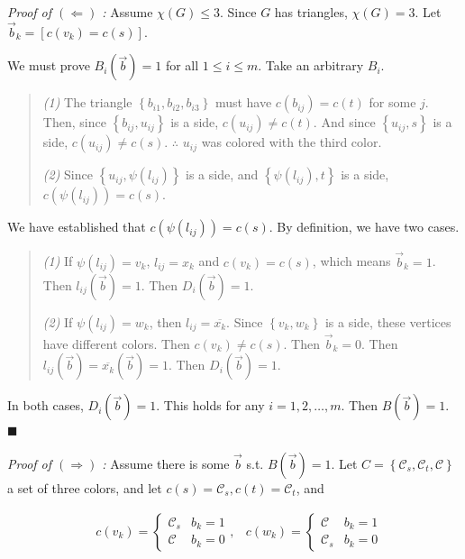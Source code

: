 \documentclass[a4paper, 12pt]{article}
\begin{document}
\textit{Proof of $(\Leftarrow)$ :} Assume $\chi(G) \leq 3$. Since $G$ has
triangles, $\chi(G) = 3$. Let $\overrightarrow{b}_k = \left[ c(v_k) = c(s)
\right] $.

We must prove $B_i(\overrightarrow{b}) = 1$ for all $1 \leq i \leq m$. Take an
arbitrary $B_i$. 


\begin{quote}

\textit{(1)} The triangle $\left\{ b_{i1}, b_{i 2}, b_{i 3} \right\} $
must have $c(b_{ij}) = c(t)$ for some $j$. Then, since $\left\{ b_{ij}, u_{ij}
\right\} $ is a side, $c(u_{ij}) \neq c(t)$. And since $\left\{ u_{ij}, s
\right\} $ is a side, $c(u_{ij}) \neq c(s)$. $\therefore $ $u_{ij}$ was
colored with the third color.

\textit{(2)} Since $\left\{ u_{ij}, \psi(l_{ij}) \right\} $ is a side, and
$\left\{ \psi(l_{ij}), t \right\} $ is a side, $c(\psi(l_{ij})) = c(s)$.

\end{quote}

We have established that $c(\psi(l_{ij})) = c(s)$. By definition, we have two
cases. 

\begin{quote}
    \textit{(1)} If $\psi(l_{ij}) = v_k$, $l_{ij} = x_k$ and $c(v_k) = c(s)$, which means $\overrightarrow{b}_k = 1$. Then $l_{ij}(\overrightarrow{b}) = 1$. Then $D_i(\overrightarrow{b}) = 1$.

    \textit{(2)} If $\psi(l_{ij}) = w_k$, then $l_{ij} = \overline{x_k}$. Since $\left\{ v_k, w_k \right\} $ is a side, these vertices have different colors. Then $c(v_k) \neq c(s)$. Then $\overrightarrow{b}_k = 0$. Then $l_{ij}(\overrightarrow{b}) = \overline{x_k}(\overrightarrow{b}) = 1$. Then $D_i(\overrightarrow{b}) = 1$.
\end{quote}

In both cases, $D_i(\overrightarrow{b}) = 1$. This holds for any $i = 1, 2,
\ldots, m$. Then $B(\overrightarrow{b}) = 1$. $\blacksquare$

\textit{Proof of $(\Rightarrow)$ :} Assume there is some $\overrightarrow{b}$
s.t. $B(\overrightarrow{b}) = 1$. Let $C = \left\{ \mathcal{C}_s,
\mathcal{C}_t, \mathcal{C} \right\} $ a set of three colors, and let $c(s) =
\mathcal{C}_s, c(t) = \mathcal{C}_t$, and 

\begin{align*}
    &c(v_k) = \begin{cases}
        \mathcal{C}_s & b_k = 1 \\ 
        \mathcal{C} & b_k = 0
    \end{cases}, &c(w_k) = \begin{cases}
    \mathcal{C} & b_k = 1 \\ 
    \mathcal{C}_s & b_k = 0
    \end{cases}
\end{align*}
\end{document}
